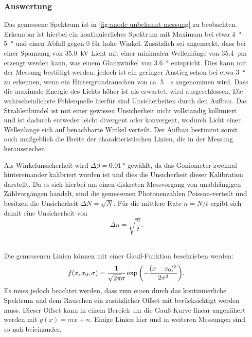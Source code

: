\subsubsection{Auswertung}
Das gemessene Spektrum ist in \cref{fig:anode-unbekannt-messung} zu beobachten. Erkennbar ist hierbei
ein kontinuierliches Spektrum mit Maximum bei etwa \qtyrange{4}{5}{\degree} und einen Abfall gegen 0
für hohe Winkel. Zusätzlich sei angemerkt, dass bei einer Spannung von \SI{35.0}{\kilo\volt}
Licht mit einer minimalen Wellenlänge von \SI{35.4}{\pm} erzeugt werden kann, was einem Glanzwinkel
von \SI{3.6}{\degree} entspricht. Dies kann mit der Messung bestätigt werden, jedoch ist ein geringer
Anstieg schon bei etwa \SI{3}{\degree} zu erkennen, wenn ein Hintergrundrauschen von ca. \SI{5}{\per\second}
angenommen wird. Dass die maximale Energie des Lichts höher ist als erwartet, wird ausgeschlossen. 
Die wahrscheinlichste Fehlerquelle hierfür sind Unsicherheiten durch den Aufbau. 
Das Strahlenbündel ist mit einer gewissen Unsicherheit nicht vollständig kollimiert und ist 
dadurch entweder leicht divergent oder konvergent, wodurch Licht einer Wellenlänge sich auf benachbarte
Winkel verteilt. Der Aufbau bestimmt somit auch maßgeblich die Breite der charakteristischen Linien, 
die in der Messung herausstechen.\par 
Als Winkelunsicherheit wird $\Delta\beta = \SI{0.01}{\degree}$ gewählt, da das Goniometer zweimal hintereinander 
kalibriert worden ist und dies die Unsicherheit dieser Kalibration darstellt. Da es sich hierbei um 
einen diskreten Messvorgang von unabhängigen Zählvorgängen handelt, sind die gemessenen Photonenzahlen 
Poisson-verteilt und besitzen die Unsicherheit $\Delta N = \sqrt{N}$. Für die mittlere Rate $n = N/t$ ergibt sich damit 
eine Unsicherheit von 
\begin{equation}
	\Delta n = \sqrt{\frac{n}{t}}.
	\label{eq:poisson_error}
\end{equation}\\\par
Die gemessenen Linien können mit einer Gauß-Funktion beschrieben werden:
\begin{equation}
	f(x,x_0,\sigma) = \frac{1}{\sqrt{2\pi}\sigma}\exp\qty(-\frac{(x-x_0)^2}{2\sigma^2}).
	\label{eq:gauss}
\end{equation}
Es muss jedoch beachtet werden, dass zum einen durch das kontinuierliche Spektrum und dem Rauschen 
ein zusätzlicher Offset mit berücksichtigt werden muss. Dieser Offset kann in einem Bereich um 
die Gauß-Kurve linear angenähert werden mit $g(x) = mx + n$. Einige Linien hier und in weiteren Messungen sind so nah beieinander, 
